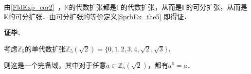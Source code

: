 



由\autoref{FldExp_cor2}~，$\mathbb{K}$的代数扩张都是$\mathbb{F}$的代数扩张，从而是$\mathbb{F}$的可分扩张，从而是$\mathbb{K}$的可分扩张．由可分扩张的等价定义\autoref{SprbEx_the5} 即得证．


\textbf{证毕}．


\begin{example}{}\label{SprbEx_ex3}
考虑$\mathbb{Z}_5$的单代数扩张$\mathbb{Z}_5(\sqrt{2})=\{0, 1, 2, 3, 4, \sqrt{2}, \sqrt{3}\}$．

则这是一个完备域，其中对于任意$a\in\mathbb{Z}_5(\sqrt{2})$，都有$a^5=a$．
\end{example}









































